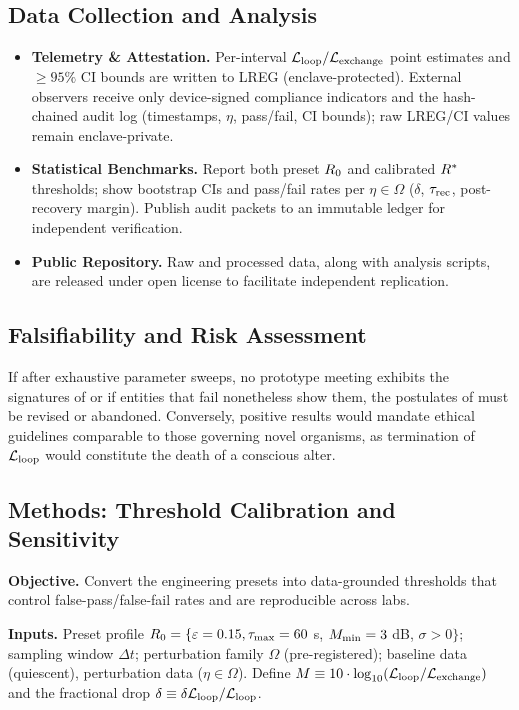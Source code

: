 \documentclass[11pt]{article}
\begin{document}
\subsection{Data Collection and Analysis}
\label{sec:data_collection}

\begin{itemize}
\item \textbf{Telemetry \& Attestation.} Per-interval $\mathcal{L}_{\text{loop}}/\mathcal{L}_{\text{exchange}}$ point estimates and $\geq 95\%$ CI bounds are written to LREG (enclave-protected). External observers receive only device-signed compliance indicators and the hash-chained audit log (timestamps, $\eta$, pass/fail, CI bounds); raw LREG/CI values remain enclave-private.
\item \textbf{Statistical Benchmarks.} Report both preset $R_0$ and calibrated $R^*$ thresholds; show bootstrap CIs and pass/fail rates per $\eta \in \Omega$ ($\delta$, $\tau_{\text{rec}}$, post-recovery margin). Publish audit packets to an immutable ledger for independent verification.
\item \textbf{Public Repository.} Raw and processed data, along with analysis scripts, are released under open license to facilitate independent replication.
\end{itemize}

\subsection{Falsifiability and Risk Assessment}
\label{sec:falsifiability}

If after exhaustive parameter sweeps, no prototype meeting \NC exhibits the signatures of  or if entities that fail \NC nonetheless show them, the postulates of  must be revised or abandoned. Conversely, positive results would mandate ethical guidelines comparable to those governing novel organisms, as termination of $\mathcal{L}_{\text{loop}}$ would constitute the death of a conscious alter.

\subsection{Methods: Threshold Calibration and Sensitivity}
\label{sec:methods_calibration}

\textbf{Objective.} Convert the engineering presets into data-grounded thresholds that control false-pass/false-fail rates and are reproducible across labs.

\textbf{Inputs.} Preset profile $R_0 = \{\varepsilon = 0.15, \tau_{\max} = 60$ s, $M_{\min} = 3$ dB, $\sigma > 0\}$; sampling window $\Delta t$; perturbation family $\Omega$ (pre-registered); baseline data (quiescent), perturbation data ($\eta \in \Omega$). Define $M \equiv 10 \cdot \log_{10}(\mathcal{L}_{\text{loop}}/\mathcal{L}_{\text{exchange}})$ and the fractional drop $\delta \equiv \delta\mathcal{L}_{\text{loop}}/\mathcal{L}_{\text{loop}}$.
\end{document}

